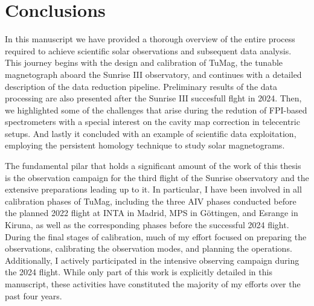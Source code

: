 \chapter{Conclusions}

In this manuscript we have provided a thorough overview of the entire process required to achieve scientific solar observations and subsequent data analysis. This journey begins with the design and calibration of TuMag, the tunable magnetograph aboard the Sunrise III observatory, and continues with a detailed description of the data reduction pipeline. Preliminary results of the data processing are also presented after the Sunrise III succesfull flght in 2024. Then, we highlighted some of the challenges that arise during the redution of FPI-based spectrometers with a special interest on the cavity map correction in telecentric setups. And lastly it concluded with an example of scientific data exploitation, employing the persistent homology technique to study solar magnetograms.

The fundamental pilar that holds a significant amount of the work of this thesis is the observation campaign for the third flight of the Sunrise observatory and the extensive preparations leading up to it. In particular, I have been involved in all calibration phases of TuMag, including the three AIV phases conducted before the planned 2022 flight at INTA in Madrid, MPS in Göttingen, and Esrange in Kiruna, as well as the corresponding phases before the successful 2024 flight. During the final stages of calibration, much of my effort focused on preparing the observations, calibrating the observation modes, and planning the operations. Additionally, I actively participated in the intensive observing campaign during the 2024 flight. While only part of this work is explicitly detailed in this manuscript, these activities have constituted the majority of my efforts over the past four years.

